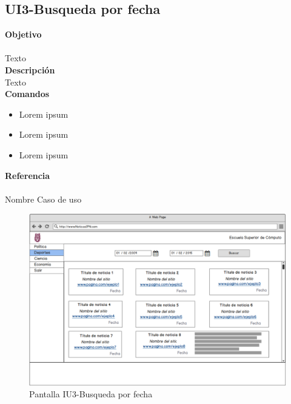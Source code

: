 \subsection{UI3-Busqueda por fecha}

\Large{\textbf{Objetivo}}\\\\
\normalsize{Texto}\\

	

\Large{\textbf{Descripción}}\\
\normalsize{Texto}\\



\Large{\textbf{Comandos}}\\
\normalsize{}

\begin{itemize}
	\item Lorem ipsum
	\item Lorem ipsum
	\item Lorem ipsum
\end{itemize}

\Large{\textbf{Referencia}}\\\\
\normalsize{Nombre Caso de uso}

\begin{figure}
  \centering
	\includegraphics[scale=.3]{imagenes/Pantallas/UI3}
  \caption{Pantalla IU3-Busqueda por fecha}
  \label{fig:IU3}
\end{figure}